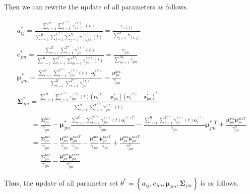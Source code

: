 \documentclass{article}
\begin{document}
    Then we can rewrite the update of all parameters as follows.
    
    \vspace{-3em}
    \begin{align*}
        & a_{ij}^* = \frac{\sum_{r=1}^R\sum_{t=1}^{t^{(r)}}\gamma_{(i,j)}^{(r)}(t)}{\sum_{r=1}^R\sum_{t=1}^{t^{(r)}}\sum_{j=1}^{N}\gamma_{(i,j)}^{(r)}(t)} = \frac{\gamma_{(i,j)}}{\sum_{j=1}^N\gamma_{(i,j)}} \\
        & c_{jm}^* = \frac{\sum_{r=1}^R\sum_{t=1}^{T^{(r)}}\gamma_{jm}^{(r)}(t)}{\sum_{r=1}^R\sum_{t=1}^{T^{(r)}}\sum_{m=1}^{M_j}\gamma_{jm}^{(r)}(t)} = \frac{\gamma_{jm}}{\sum_{m=1}^{M_j}\gamma_{jm}} \\
        & \boldsymbol{\mu}_{jm}^* = \frac{\sum_{r=1}^R\sum_{t=1}^{T^{(r)}}\gamma_{jm}^{(r)}(t)\cdot\mathbf{o}_t^{(r)}}{\sum_{r=1}^R\sum_{t=1}^{T^{(r)}}\gamma_{jm}^{(r)}} = \frac{\boldsymbol{\mu}_{jm}^{\mathtt{acc}}}{\gamma_{jm}} \\
        & \boldsymbol{\Sigma}_{jm}^*=\frac{\sum_{r=1}^R\sum_{t=1}^{T^{(r)}}\gamma_{jm}^{(r)}(t)\left(\mathbf{o}^{(r)}_t-\boldsymbol{\mu}^*_{jm}\right)\left(\mathbf{o}^{(r)}_t-\boldsymbol{\mu}^*_{jm}\right)^T}{\sum_{r=1}^R\sum_{t=1}^{T^{(r)}}\gamma_{jm}^{(r)}(t)} \\
        &\qquad = \frac{\boldsymbol{\Sigma}_{jm}^{\mathtt{acc}}}{\gamma_{jm}}-\boldsymbol{\mu}_{jm}^*\frac{\sum_{r=1}^R\sum_{t=1}^{T^{(r)}}\gamma_{jm}^{(r)}(t)\mathbf{o}^{(r)T}_t}{\gamma_{jm}}-\frac{\sum_{r=1}^R\sum_{t=1}^{T^{(r)}}\gamma_{jm}^{(r)}(t)\mathbf{o}^{(r)}_t}{\gamma_{jm}}\boldsymbol{\mu}_{jm}^{*\ \ T} + \frac{\boldsymbol{\mu}_{jm}^{\mathtt{acc}}\boldsymbol{\mu}_{jm}^{\mathtt{acc}T}}{\gamma_{jm}^2} \\
        &\qquad = \frac{\boldsymbol{\Sigma}_{jm}^{\mathtt{acc}}}{\gamma_{jm}} - \frac{\boldsymbol{\mu}_{jm}^{\mathtt{acc}}}{\gamma_{jm}}\frac{\boldsymbol{\mu}_{jm}^{\mathtt{acc}T}}{\gamma_{jm}}-\frac{\boldsymbol{\mu}_{jm}^{\mathtt{acc}}}{\gamma_{jm}}\frac{\boldsymbol{\mu}_{jm}^{\mathtt{acc}T}}{\gamma_{jm}} + \frac{\boldsymbol{\mu}_{jm}^{\mathtt{acc}}\boldsymbol{\mu}_{jm}^{\mathtt{acc}T}}{\gamma_{jm}^2} \\
        &\qquad = \frac{\boldsymbol{\Sigma}_{jm}^{\mathtt{acc}}}{\gamma_{jm}} - \frac{\boldsymbol{\mu}_{jm}^{\mathtt{acc}}\boldsymbol{\mu}_{jm}^{\mathtt{acc}T}}{\gamma_{jm}^2}
    \end{align*}
    
     Thus, the update of all parameter set $\theta^*=\left\{a_{ij},c_{jm},\boldsymbol{\mu}_{jm},\boldsymbol{\Sigma}_{jm}\right\}$ is as follows.
     
\end{document}
